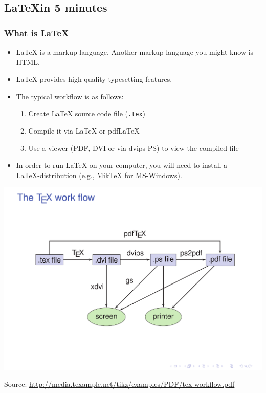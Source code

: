 \documentclass[bigger]{beamer}
\begin{document}
\subsection{\LaTeX in 5 minutes}
\label{sec-6-2}
\begin{frame}
\frametitle{What is \LaTeX}
\label{sec-6-2-1}
\begin{itemize}

\item \LaTeX{} is a markup language. Another markup language you might know is HTML.
\label{sec-6-2-1-1}%

\item \LaTeX{} provides high-quality typesetting features.
\label{sec-6-2-1-2}%

\item The typical workflow is as follows:
\label{sec-6-2-1-3}%
\begin{enumerate}
\item Create \LaTeX{} source code file (\texttt{.tex})
\item Compile it via \LaTeX{} or pdf\LaTeX
\item Use a viewer (PDF, DVI or via dvips PS) to view the compiled file
\end{enumerate}

\item In order to run \LaTeX{} on your computer, you will need to install a\\
\label{sec-6-2-1-4}%
\LaTeX-distribution (e.g., Mik\TeX{} for MS-Windows).  


\end{itemize} %
\end{frame}
\begin{frame}

        \includegraphics[width=\textwidth]{../graph/tex-workflow.pdf}

    Source: \href{http://media.texample.net/tikz/examples/PDF/tex-workflow.pdf}{http://media.texample.net/tikz/examples/PDF/tex-workflow.pdf}
\end{frame}
\end{document}
